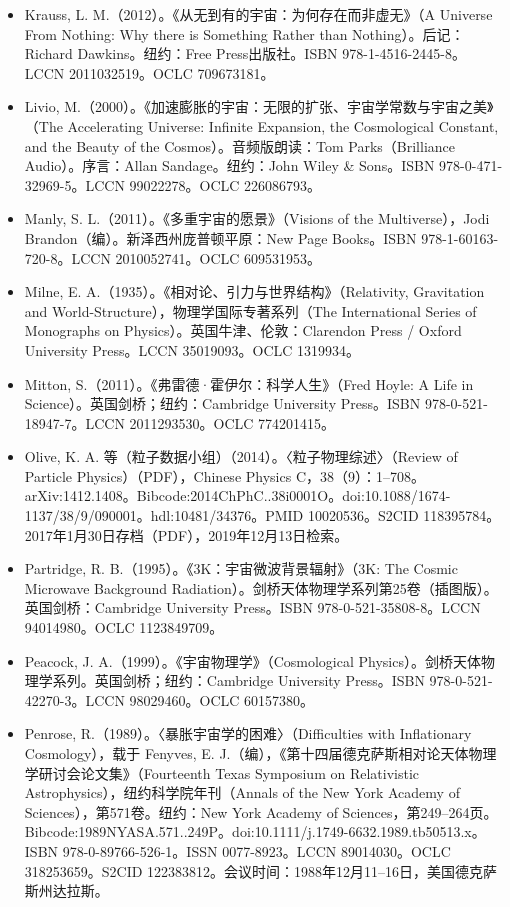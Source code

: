 \begin{itemize}
\item Krauss, L. M.（2012）。《从无到有的宇宙：为何存在而非虚无》（A Universe From Nothing: Why there is Something Rather than Nothing）。后记：Richard Dawkins。纽约：Free Press出版社。ISBN 978-1-4516-2445-8。LCCN 2011032519。OCLC 709673181。  
\item Livio, M.（2000）。《加速膨胀的宇宙：无限的扩张、宇宙学常数与宇宙之美》（The Accelerating Universe: Infinite Expansion, the Cosmological Constant, and the Beauty of the Cosmos）。音频版朗读：Tom Parks（Brilliance Audio）。序言：Allan Sandage。纽约：John Wiley & Sons。ISBN 978-0-471-32969-5。LCCN 99022278。OCLC 226086793。  
\item Manly, S. L.（2011）。《多重宇宙的愿景》（Visions of the Multiverse），Jodi Brandon（编）。新泽西州庞普顿平原：New Page Books。ISBN 978-1-60163-720-8。LCCN 2010052741。OCLC 609531953。  
\item Milne, E. A.（1935）。《相对论、引力与世界结构》（Relativity, Gravitation and World-Structure），物理学国际专著系列（The International Series of Monographs on Physics）。英国牛津、伦敦：Clarendon Press / Oxford University Press。LCCN 35019093。OCLC 1319934。  
\item Mitton, S.（2011）。《弗雷德·霍伊尔：科学人生》（Fred Hoyle: A Life in Science）。英国剑桥；纽约：Cambridge University Press。ISBN 978-0-521-18947-7。LCCN 2011293530。OCLC 774201415。  
\item Olive, K. A. 等（粒子数据小组）（2014）。〈粒子物理综述〉（Review of Particle Physics）（PDF），Chinese Physics C，38（9）：1–708。arXiv:1412.1408。Bibcode:2014ChPhC..38i0001O。doi:10.1088/1674-1137/38/9/090001。hdl:10481/34376。PMID 10020536。S2CID 118395784。2017年1月30日存档（PDF），2019年12月13日检索。  
\item Partridge, R. B.（1995）。《3K：宇宙微波背景辐射》（3K: The Cosmic Microwave Background Radiation）。剑桥天体物理学系列第25卷（插图版）。英国剑桥：Cambridge University Press。ISBN 978-0-521-35808-8。LCCN 94014980。OCLC 1123849709。  
\item Peacock, J. A.（1999）。《宇宙物理学》（Cosmological Physics）。剑桥天体物理学系列。英国剑桥；纽约：Cambridge University Press。ISBN 978-0-521-42270-3。LCCN 98029460。OCLC 60157380。  
\item Penrose, R.（1989）。〈暴胀宇宙学的困难〉（Difficulties with Inflationary Cosmology），载于 Fenyves, E. J.（编），《第十四届德克萨斯相对论天体物理学研讨会论文集》（Fourteenth Texas Symposium on Relativistic Astrophysics），纽约科学院年刊（Annals of the New York Academy of Sciences），第571卷。纽约：New York Academy of Sciences，第249–264页。Bibcode:1989NYASA.571..249P。doi:10.1111/j.1749-6632.1989.tb50513.x。ISBN 978-0-89766-526-1。ISSN 0077-8923。LCCN 89014030。OCLC 318253659。S2CID 122383812。会议时间：1988年12月11–16日，美国德克萨斯州达拉斯。

\end{itemize}
